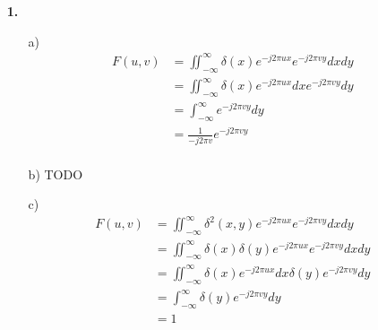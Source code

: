 \documentclass[a4paper,11pt]{article}
\author{\authorinfotitle}
\title{\titleinfo}
\date{\today}
\begin{document}
	\maketitle
	\begin{enumerate}
		\item[\textbf{1.}]
			\begin{enumerate}
				\item[a)]
					\begin{align*}
					F(u,v) &= \iint_{-\infty}^{\infty}\delta(x)e^{-j2\pi ux}e^{-j2\pi vy}dx dy\\
					&=\iint_{-\infty}^{\infty}\delta(x)e^{-j2\pi ux}dx e^{-j2\pi vy}dy\\
					&=\int_{-\infty}^{\infty} e^{-j2\pi vy}dy\\
					&= \frac{1}{-j2\pi v} e^{-j2\pi vy}\\
					\end{align*}
				\item[b)]
					TODO
				\item[c)]
					\begin{align*}
					F(u,v) &= \iint_{-\infty}^{\infty}\delta^2(x,y)e^{-j2\pi ux}e^{-j2\pi vy}dx dy\\
					&= \iint_{-\infty}^{\infty}\delta(x)\delta(y)e^{-j2\pi ux}e^{-j2\pi vy}dx dy\\
					&=\iint_{-\infty}^{\infty}\delta(x)e^{-j2\pi ux}dx \delta(y)e^{-j2\pi vy}dy\\
					&=\int_{-\infty}^{\infty} \delta(y)e^{-j2\pi vy}dy\\
					&= 1\\
					\end{align*}
			\end{enumerate}
	\end{enumerate}
\end{document}
